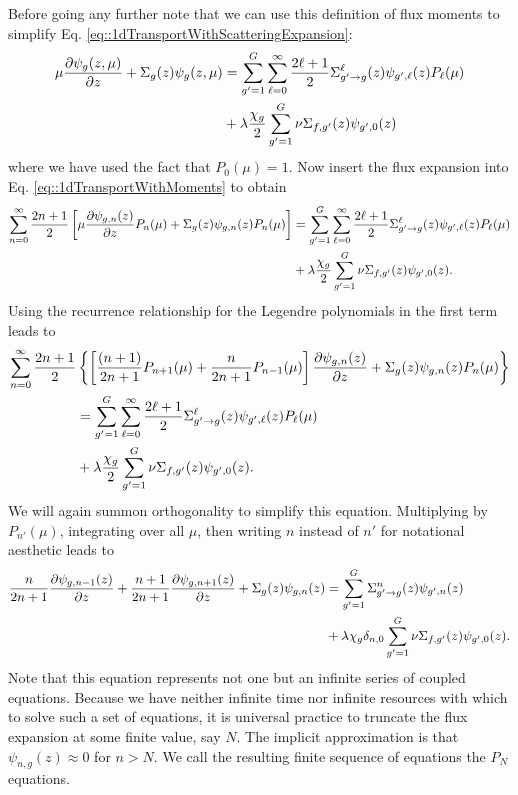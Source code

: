 \documentclass[11pt]{article}
\begin{document}
Before going any further note that we can use this definition of flux moments to simplify Eq. \eqref{eq::1dTransportWithScatteringExpansion}:
\begin{align}
  \mu \frac{\partial \psi_g(z,\mu)}{\partial z}
  + \Sigma_g(z) \psi_g(z,\mu)
  &= \sum_{g'=1}^G \sum_{\ell=0}^\infty \frac{2\ell+1}{2} \Sigma_{g' \rightarrow g}^\ell(z) \psi_{g',\ell}(z) P_\ell(\mu) \notag\\
  &+ \lambda\frac{\chi_g}{2} \sum_{g'=1}^G \nu\Sigma_{f,g'}(z) \psi_{g',0}(z)
  \label{eq::1dTransportWithMoments}
\end{align}
where we have used the fact that \(P_0(\mu) = 1\).  Now insert the flux expansion into Eq. \eqref{eq::1dTransportWithMoments} to obtain
\begin{align}
  \sum_{n=0}^\infty \frac{2n+1}{2} \left[ \mu \frac{\partial \psi_{g,n}(z)}{\partial z} P_n(\mu)
  + \Sigma_g(z) \psi_{g,n}(z) P_n(\mu) \right]  
  &= \sum_{g'=1}^G \sum_{\ell=0}^\infty \frac{2\ell+1}{2} \Sigma_{g' \rightarrow g}^\ell(z) \psi_{g',\ell}(z) P_\ell(\mu) \notag\\
  &+ \lambda\frac{\chi_g}{2} \sum_{g'=1}^G \nu\Sigma_{f,g'}(z) \psi_{g',0}(z).
  \label{eq::1dTransportWithFluxExpansion}
\end{align}
Using the recurrence relationship for the Legendre polynomials in the first term leads to
\begin{align}
  \sum_{n=0}^\infty \frac{2n+1}{2} &\left\{ \left[ \frac{(n+1)}{2n+1} P_{n+1}(\mu) + \frac{n}{2n+1} P_{n-1}(\mu) \right] 
  \frac{\partial \psi_{g,n}(z)}{\partial z} 
  + \Sigma_g(z) \psi_{g,n}(z) P_n(\mu) \right\} \notag\\
  &= \sum_{g'=1}^G \sum_{\ell=0}^\infty \frac{2\ell+1}{2} \Sigma_{g' \rightarrow g}^\ell(z) \psi_{g',\ell}(z) P_\ell(\mu) \notag\\
  &+ \lambda\frac{\chi_g}{2} \sum_{g'=1}^G \nu\Sigma_{f,g'}(z) \psi_{g',0}(z).
  \label{eq::1dTransportWithFluxExpansion}
\end{align}
We will again summon orthogonality to simplify this equation.  Multiplying by \(P_{n'}(\mu)\), integrating over all \(\mu\), then writing \(n\) instead of \(n'\) for notational aesthetic leads to
\begin{align}
  \frac{n}{2n+1} \frac{\partial \psi_{g,n-1}(z)}{\partial z} + \frac{n+1}{2n+1} \frac{\partial \psi_{g,n+1}(z)}{\partial z}
  + \Sigma_g(z) \psi_{g,n}(z)
  &= \sum_{g'=1}^G \Sigma_{g' \rightarrow g}^n(z) \psi_{g',n}(z) \notag\\
  &+ \lambda \chi_g \delta_{n,0} \sum_{g'=1}^G \nu\Sigma_{f,g'}(z) \psi_{g',0}(z).
  \label{eq::1dTransportPNInf}
\end{align}
Note that this equation represents not one but an infinite series of coupled equations.  Because we have neither infinite time nor infinite resources with which to solve such a set of equations, it is universal practice to truncate the flux expansion at some finite value, say \(N\).  The implicit approximation is that \(\psi_{n,g}(z) \approx 0\) for \(n>N\).  We call the resulting finite sequence of equations the \(P_N\) equations.
\end{document}
